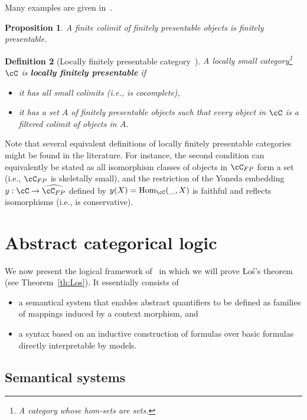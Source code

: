 \documentclass[preprint,3p,times]{elsarticle}
\newtheorem{definition}{Definition}[section]
\newtheorem{proposition}[definition]{Proposition}
\newcommand{\Hom}{\mathrm{Hom}}
\newcommand{\Los}{\L{}o{\'s}}
\begin{document}
Many examples are given in~\cite{adamek_locally_1994}.

\begin{proposition}
    A finite colimit of finitely presentable objects is finitely presentable.
\end{proposition}

\begin{definition}[Locally finitely presentable category~\cite{adamek_locally_1994}]
	\label{def:lfp category}
    A locally small category\footnote{A category whose hom-sets are sets.} \(\cC\) is {\bf locally finitely presentable} if
    \begin{itemize}
        \item it has all small colimits (i.e., is cocomplete),
        \item it has a set \(A\) of finitely presentable objects such that every object in \(\cC\) is a filtered colimit of objects in \(A\).
    \end{itemize}
\end{definition}

Note that several equivalent definitions of locally finitely presentable categories might be found in the literature. For instance, the second condition can equivalently be stated as all isomorphism classes of objects in \(\cC_{FP}\) form a set (i.e., \(\cC_{FP}\) is skeletally small), and the restriction of the Yoneda embedding \(y : \cC \to \widehat{\cC_{FP}}\) defined by \(y(X) = \Hom_\cC(\_,X)\) is faithful and reflects isomorphisms (i.e., is conservative).

\section{Abstract categorical logic}
\label{sec:abstract categorical logic}

We now present the logical framework of~\cite{AB23} in which we will prove \Los's theorem (see Theorem~\ref{th:Los}). It essentially consists of 
\begin{itemize}
    \item a semantical system that enables abstract quantifiers to be defined as families of mappings induced by a context morphism, and
    \item a syntax based on an inductive construction of formulas over basic formulas directly interpretable by models.
\end{itemize}

\subsection{Semantical systems}
\label{subsec:semanticalsystems}
\end{document}
